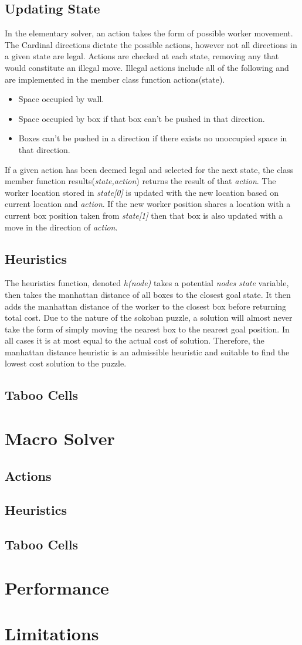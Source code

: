 \documentclass[]{article}
\begin{document}
\subsection{Updating State}
In the elementary solver, an action takes the form of possible worker movement. The Cardinal directions dictate the possible actions, however not all directions in a given state are legal. Actions are checked at each state, removing any that would constitute an illegal move. Illegal actions include all of the following and are implemented in the member class function actions(state).
\begin{itemize}
	\item Space occupied by wall.
	\item Space occupied by box if that box can't be pushed in that direction.
	\item Boxes can't be pushed in a direction if there exists no unoccupied space in that direction.
\end{itemize}
If a given action has been deemed legal and selected for the next state, the class member function results(\textit{state,action}) returns the result of that \textit{action}. The worker location stored in \textit{state[0]} is updated with the new location based on current location and \textit{action}. If the new worker position shares a location with a current box position taken from \textit{state[1]} then that box is also updated with a move in the direction of \textit{action}.
\subsection{Heuristics}
The heuristics function, denoted \textit{h(node)} takes a potential \textit{nodes state} variable, then takes the manhattan distance of all boxes to the closest goal state. It then adds the manhattan distance of the worker to the closest box before returning total cost. Due to the nature of the sokoban puzzle, a solution will almost never take the form of simply moving the nearest box to the nearest goal position. In all cases it is at most equal to the actual cost of solution. Therefore, the manhattan distance heuristic is an admissible heuristic and suitable to find the lowest cost solution to the puzzle. 
\subsection{Taboo Cells}
\section{Macro Solver}
\subsection{Actions}
\subsection{Heuristics}
\subsection{Taboo Cells}
\section{Performance}
\section{Limitations}
\end{document}
